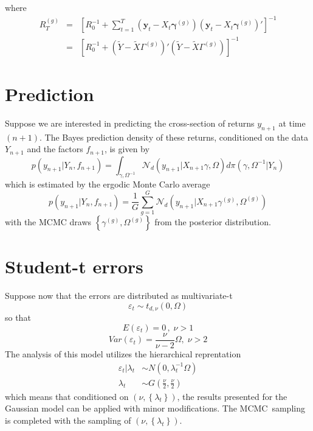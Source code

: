\documentclass[12pt]{article}
\begin{document}
where
\begin{eqnarray*}
  R_T^{(g)} &=&  \left[ R_0^{-1} + \sum_{t=1}^{T} \left( \mathbf{y}_t - X_t \boldsymbol{\gamma}^{(g)} \right)\left( \mathbf{y}_t - X_t \boldsymbol{\gamma}^{(g)} \right)' \right]^{-1}\\
  &=& \left[  R_0^{-1} + \left( \widetilde{Y} - \widetilde{X} \Gamma^{(g)} \right)'\left( \widetilde{Y} - \widetilde{X} \Gamma^{(g)} \right)\right]^{-1}
\end{eqnarray*}



\section{Prediction}

Suppose we are interested in predicting the cross-section of returns $y_{n+1}
$ at time $(n+1)$. The Bayes prediction density of these returns,
conditioned on the data $Y_{n+1}$ and the factors $f_{n+1}$, is given by%
\begin{equation*}
p(y_{n+1}|Y_{n},f_{n+1})=\int_{\gamma ,\Omega ^{-1}}\mathcal{N}_{d}\left(
y_{n+1}|X_{n+1}\gamma ,\Omega \right) d\pi \left( \gamma ,\Omega
^{-1}|Y_{n}\right)
\end{equation*}%
which is estimated by the ergodic Monte Carlo average
\begin{equation*}
p(y_{n+1}|Y_{n},f_{n+1})=\frac{1}{G}\sum_{g=1}^{G}\mathcal{N}_{d}\left(
y_{n+1}|X_{n+1}\gamma ^{(g)},\Omega ^{(g)}\right)
\end{equation*}%
with the MCMC draws $\left\{ \gamma ^{(g)},\Omega ^{(g)}\right\} $ from the
posterior distribution.


\section{Student-t errors}

Suppose now that the errors are distributed as multivariate-t%
\begin{equation*}
\varepsilon _{t}\sim t_{d,\nu }\left( 0,\Omega \right)
\end{equation*}%
so that%
\begin{equation*}
E(\varepsilon _{t})=0\,,\;\nu >1
\end{equation*}%
\begin{equation*}
Var\left( \varepsilon _{t}\right) =\frac{\nu }{\nu -2}\Omega ,\;\nu >2
\end{equation*}%
The analysis of this model utilizes the hierarchical reprentation
\begin{align*}
\varepsilon _{t}|\lambda _{t} &\sim N\left( 0,\lambda _{t}^{-1}\Omega \right)
\\
\lambda _{t} &\sim G\left( \frac{\nu }{2},\frac{\nu }{2}\right)
\end{align*}%
which means that conditioned on $\left( \nu ,\left\{ \lambda _{t}\right\}
\right) $, the results presented for the Gaussian model can be applied with
minor modifications. The MCMC\ sampling is completed with the sampling of $%
\left( \nu ,\left\{ \lambda _{t}\right\} \right) $.
\end{document}
